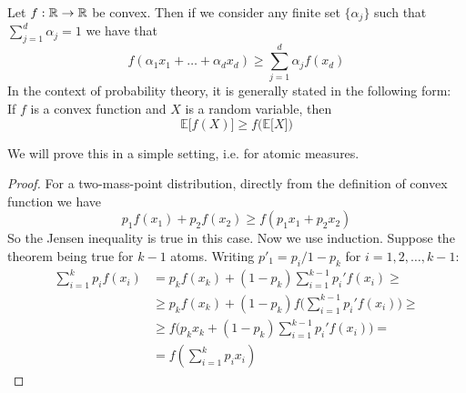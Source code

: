 \begin{theorem}
\label{th:jensen_inequality}
            Let $f: \mathbb{R} \rightarrow \mathbb{R}$ be convex. Then if we consider any finite set $\{ \alpha_j \}$ such that $\sum_{j=1}^d \alpha_j = 1$ we have that
            \begin{equation*}
                f(\alpha_1 x_1 + \dots + \alpha_d x_d) \geq \sum_{j=1}^d \alpha_j f(x_d)
            \end{equation*}
            In the context of probability theory, it is generally stated in the following form: 
            \\If $f$ is a convex function and $X$ is a random variable, then 
            \begin{equation}
                \mathbb{E}\big[ f(X) \big] \geq f \big( \mathbb{E}\big[X\big] \big)
            \end{equation}
\end{theorem}
We will prove this in a simple setting, i.e. for atomic measures.
\begin{proof}
\hfill
    For a two-mass-point distribution, directly from the definition of convex function we have 
    \begin{equation*}
        p_1 f(x_1) + p_2 f(x_2) \geq f (p_1 x_1 + p_2 x_2)
    \end{equation*}
    So the Jensen inequality is true in this case. Now we use induction. Suppose the theorem being true for $k-1$ atoms. Writing $p'_1 = p_i/1-p_k$ for $i = 1,2, \dots, k-1$:
    \begin{align*}
        \sum_{i=1}^k p_i f(x_i) & = p_k f(x_k) + (1 - p_k) \sum_{i=1}^{k-1} p_i' f(x_i) \geq \\ & \geq p_k f(x_k) + (1-p_k) f \big( \sum_{i=1}^{k-1} p_i' f(x_i) \big) \geq \\ & \geq f \big( p_k x_k + (1-p_k) \sum_{i=1}^{k-1} p_i' f(x_i) \big) = \\ & = f ( \sum_{i=1}^k p_i x_i )
    \end{align*}
\end{proof}

